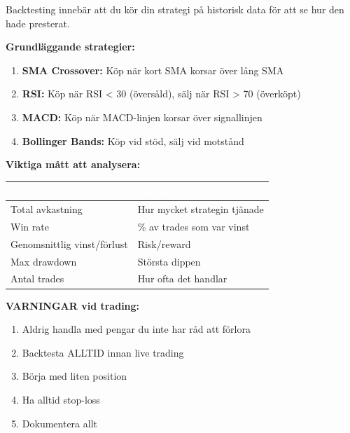 \documentclass[12pt,a4paper,swedish]{article}
\begin{document}
Backtesting innebär att du kör din strategi på historisk data för att se hur den hade presterat.

\bigskip

\textbf{Grundläggande strategier:}

\begin{enumerate}
    \item \textbf{SMA Crossover:} Köp när kort SMA korsar över lång SMA
    \item \textbf{RSI:} Köp när RSI < 30 (översåld), sälj när RSI > 70 (överköpt)
    \item \textbf{MACD:} Köp när MACD-linjen korsar över signallinjen
    \item \textbf{Bollinger Bands:} Köp vid stöd, sälj vid motstånd
\end{enumerate}

\bigskip

\textbf{Viktiga mått att analysera:}

\begin{center}
\begin{tabular}{|p{5cm}|p{8cm}|}
\hline
\rowcolor{secondary}
\textcolor{white}{\textbf{Mått}} & \textcolor{white}{\textbf{Vad det visar}} \\
\hline
Total avkastning & Hur mycket strategin tjänade \\
\hline
Win rate & \% av trades som var vinst \\
\hline
Genomsnittlig vinst/förlust & Risk/reward \\
\hline
Max drawdown & Största dippen \\
\hline
Antal trades & Hur ofta det handlar \\
\hline
\end{tabular}
\end{center}

\bigskip

\color{warning}\textbf{VARNINGAR vid trading:}\color{black}
\begin{enumerate}
    \item Aldrig handla med pengar du inte har råd att förlora
    \item Backtesta ALLTID innan live trading
    \item Börja med liten position
    \item Ha alltid stop-loss
    \item Dokumentera allt
\end{enumerate}

\newpage

\end{document}
